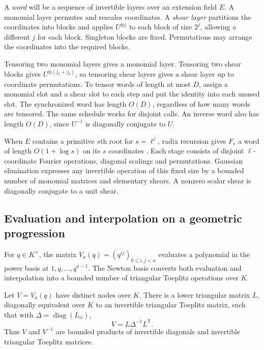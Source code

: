 A \emph{word} will be a sequence of invertible layers over an extension
field \(E\). A monomial layer permutes and rescales coordinates. A
\emph{shear layer} partitions the coordinates into blocks and applies
\(U^{\otimes j}\) to each block of size \(2^j\), allowing a different
\(j\) for each block. Singleton blocks are fixed. Permutations may
arrange the coordinates into the required blocks.

Tensoring two monomial layers gives a monomial layer. Tensoring two
shear blocks gives \(U^{\otimes(j_1+j_2)}\), so tensoring shear layers
gives a shear layer up to coordinate permutations. To tensor words of
length at most \(D\), assign a monomial slot and a shear slot to each
step and put the identity into each unused slot. The synchronized word
has length \(O(D)\), regardless of how many words are tensored. The
same schedule works for disjoint calls. An inverse word also has length
\(O(D)\), since \(U^{-1}\) is diagonally conjugate to \(U\).

When \(E\) contains a primitive \(s\)th root for \(s=\ell^j\), radix
recursion gives \(F_s\) a word of length \(O(1+\log s)\) on its \(s\)
coordinates \cite{CooleyTukey}. Each stage consists of disjoint
\(\ell\)-coordinate Fourier operations, diagonal scalings and
permutations. Gaussian elimination expresses any invertible operation
of this fixed size by a bounded number of monomial matrices and
elementary shears. A nonzero scalar shear is diagonally conjugate to
a unit shear.

\subsection{Evaluation and interpolation on a geometric progression}

For \(q\in K^\times\), the matrix
\(V_a(q)=(q^{ij})_{0\le i,j<a}\) evaluates a polynomial in the
power basis at \(1,q,\ldots,q^{a-1}\). The Newton basis converts both
evaluation and interpolation into a bounded number of triangular
Toeplitz operations over \(K\).

\begin{lemma}\label{up:newton-lemma}
Let \(V=V_a(q)\) have distinct nodes over \(K\). There is a lower
triangular matrix \(L\), diagonally equivalent over \(K\) to an
invertible triangular Toeplitz matrix, such that with
\(\Delta=\operatorname{diag}(L_{ii})\),
\begin{equation}\label{up:newton}
                         V=L\Delta^{-1}L^{\mathsf T}.
\end{equation}
Thus \(V\) and \(V^{-1}\) are bounded products of invertible diagonals
and invertible triangular Toeplitz matrices.
\end{lemma}

